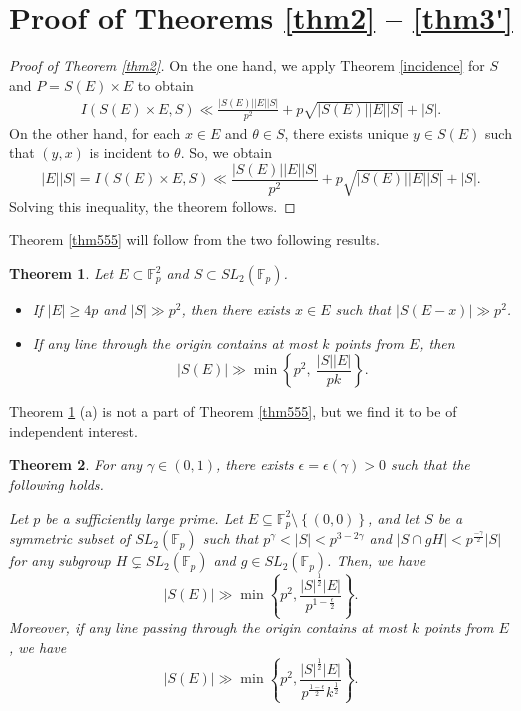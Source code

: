 \documentclass[11pt]{article}
\newtheorem{theorem}{Theorem}[section]
\def\Fbb{\mathbb{F}}
\def\SL{SL}
\def\lv{\left\vert}
\def\rv{\right\vert}
\def\lo{\left\{}
\def\ro{\right\}}
\begin{document}

\section{Proof of Theorems \ref{thm2} -- \ref{thm3'}}
\begin{proof}[Proof of Theorem \ref{thm2}]
On the one hand, we apply Theorem \ref{incidence} for $S$ and $P= S(E) \times E$ to obtain
\begin{align}\label{eq: 1}
    I(S(E)\times E,S) \ll \frac{\lv S(E)\rv \lv E\rv \lv S\rv}{p^2} + p\sqrt{\lv S(E)\rv \lv E\rv \lv S\rv} + \lv S\rv.
\end{align}
On the other hand, for each $x\in E$ and $\theta \in S$, there exists unique $y\in S(E)$ such that $(y,x)$ is incident to $\theta$. So, we obtain
 \[|E||S|=I(S(E)\times E,S) \ll \frac{\lv S(E)\rv \lv E\rv \lv S\rv}{p^2} + p\sqrt{\lv S(E)\rv \lv E\rv \lv S\rv} + \lv S\rv.\]
 Solving this inequality, the theorem follows. 
\end{proof}
Theorem \ref{thm555} will follow from the two following results. 
\begin{theorem}\label{thm1}
    Let $E\subset \mathbb{F}_p^2$ and $S\subset SL_2(\mathbb{F}_p)$.
\begin{itemize}
    \item[a.] If  $|E|\ge 4p$ and $|S|\gg p^2$, then there exists $x\in E$ such that $|S(E-x)|\gg p^2$. 
    \item[b.] If any line through the origin contains at most $k$ points from $E$, then 
     \[|S(E)|\gg \min \left\lbrace p^2, ~\frac{|S||E|}{pk} \right\rbrace.\]
\end{itemize}
\end{theorem}
Theorem \ref{thm1} (a) is not a part of Theorem \ref{thm555}, but we find it to be of independent interest. 

\begin{theorem}\label{thm5}
For any $\gamma\in (0, 1)$, there exists $\epsilon=\epsilon(\gamma)>0$ such that the following holds.

     Let $p$ be a sufficiently large prime. Let $E \subseteq \Fbb_p^2  \setminus \lo (0, 0)\ro$, and let $S$ be a symmetric subset of $\SL_2 (\Fbb_p )$ such that $p^\gamma < |S| < p^{3-2\gamma } $ and $ |S \cap gH| < p^{\frac{-\gamma}{2}}|S|$ for any subgroup $H \subsetneq \SL_2 (\Fbb_p) $ and $g\in \SL_2(\Fbb_p)$. Then, we have 
    \[ |S(E)| \gg \min \lo p^2 , \frac{|S|^{\frac{1}{2}}|E|}{p^{1-\frac{\epsilon}{2}}} \ro .\] Moreover,  if any line passing through the origin contains at most $k$ points from $E$, we have
    \[ |S(E)| \gg \min \lo p^2 ,\frac{|S|^{\frac{1}{2}}|E|}{p^{\frac{1-\epsilon}{2}}k^{\frac{1}{2}}} \ro .\]
\end{theorem}
\end{document}
